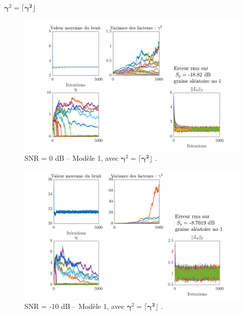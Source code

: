 \documentclass[ 12pt]{article}
\newcommand{\diag}[1]{\lceil#1\rfloor}
\begin{document}
\paragraph{$\bm{\gamma}^2 = \diag{\bm{\gamma^2 }}$}
\begin{figure}[H]
	\centering
	\includegraphics[width=\textwidth]{ToyCase/modele1_diffgamma2.png}	
	\caption{SNR = 0 dB  -- Modèle 1, avec $\bm{\gamma}^2  = \diag{\bm{\gamma^2 }}$ .}
\end{figure}
\begin{figure}[H]
	\centering
	\includegraphics[width=\textwidth]{ToyCase/modele1_diffgamma2_snrm10db.png}	
	\caption{SNR = -10 dB  -- Modèle 1, avec $\bm{\gamma}^2  = \diag{\bm{\gamma^2 }}$ .}
\end{figure}

\end{document}
